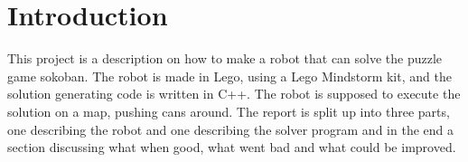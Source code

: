 \section{Introduction}
This project is a description on how to make a robot that can solve the puzzle game sokoban. 
The robot is made in Lego, using a Lego Mindstorm kit, and the solution generating code is written in C++. 
The robot is supposed to execute the solution on a map, pushing cans around. 
The report is split up into three parts, one describing the robot and one describing the solver program and in the end a section discussing what when good, what went bad and what could be improved.
